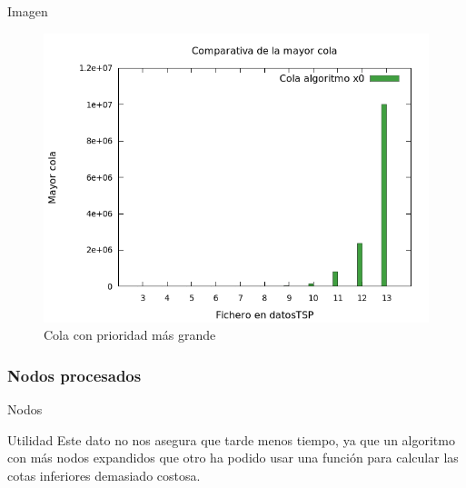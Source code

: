 \begin{frame}
	\begin{exampleblock}{Imagen}
	\begin{figure}[H]
    		\centering
	    \includegraphics[scale=0.35]{../TSP/Graficas/graficaColaMaxima.png}
    		\caption{Cola con prioridad más grande}
	\end{figure}
	\end{exampleblock}
\end{frame}


\subsubsection{Nodos procesados}
\begin{frame}{Nodos}
	\begin{block}{Utilidad}
	Este dato no nos asegura que tarde menos tiempo, ya que un algoritmo con más nodos 
	expandidos que otro ha podido usar una función para calcular las cotas inferiores demasiado costosa.
	\end{block}
\end{frame}

